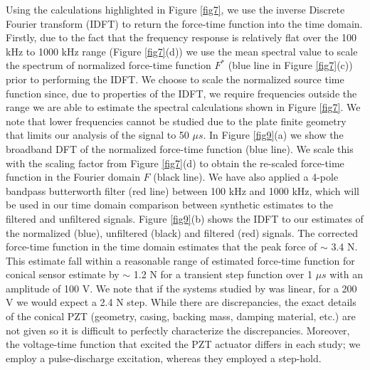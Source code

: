 \documentclass[preprint,3p, 11pt,authoryear]{elsarticle}
\begin{document}
{Using the calculations highlighted in Figure \ref{fig7}, we use the inverse Discrete Fourier transform (IDFT) to return the force-time function into the time domain. Firstly, due to the fact that the frequency response is relatively flat over the 100 kHz to 1000 kHz range (Figure \ref{fig7}(d)) we use the mean spectral value to scale the spectrum of normalized force-time function $F^{*}$ (blue line in Figure \ref{fig7}(c)) prior to performing the IDFT. We choose to scale the normalized source time function since, due to properties of the IDFT, we require frequencies outside the range we are able to estimate the spectral calculations shown in Figure \ref{fig7}.  We note that lower frequencies cannot be studied due to the plate finite geometry that limits our analysis of the signal to 50 $\mu s$.  In Figure \ref{fig9}(a) we show the broadband DFT of the normalized force-time function (blue line).  We scale this with the scaling factor from Figure \ref{fig7}(d) to obtain the re-scaled force-time function in the Fourier domain $F$ (black line). We have also applied a 4-pole bandpass butterworth filter (red line) between 100 kHz and 1000 kHz, which will be used in our time domain comparison between synthetic estimates to the filtered and unfiltered signals. Figure \ref{fig9}(b) shows the IDFT to our estimates of the normalized (blue), unfiltered (black) and filtered (red) signals.  The corrected force-time function in the time domain estimates that the peak force of $\sim$ 3.4 N. This estimate fall within a reasonable range of estimated force-time function for conical sensor estimate by \citet{Breckenridge1990} $\sim $ 1.2 N for a transient step function over 1 $\mu s$ with an amplitude of 100 V. We note that if the systems studied by \citet{Breckenridge1990} was linear, for a 200 V we would expect a 2.4 N step.  While there are discrepancies, the exact details of the conical PZT (geometry, casing, backing mass, damping material, etc.) are not given so it is difficult to perfectly characterize the discrepancies. Moreover, the voltage-time function that excited the PZT actuator differs in each study; we employ a pulse-discharge excitation, whereas they employed a step-hold.

}
\end{document}
